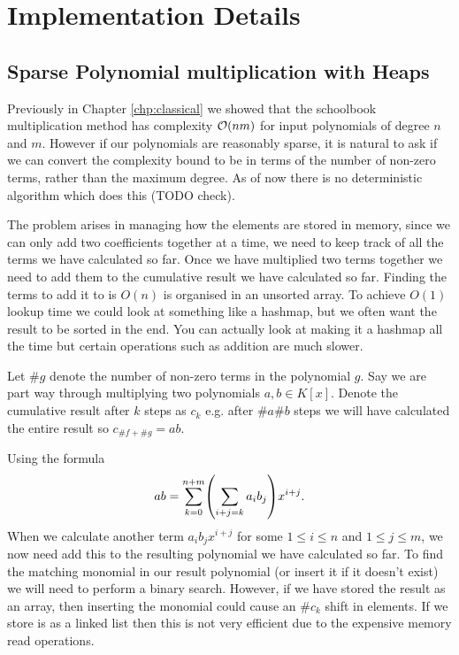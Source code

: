 \chapter{Implementation Details}\label{chp:implementation}

\section{Sparse Polynomial multiplication with Heaps}

Previously in Chapter \ref{chp:classical} we showed that the schoolbook multiplication method has complexity $\mathcal O(nm)$ for input polynomials of degree $n$ and $m$. However if our polynomials are reasonably sparse, it is natural to ask if we can convert the complexity bound to be in terms of the number of non-zero terms, rather than the maximum degree. As of now there is no deterministic algorithm which does this (TODO check). 

The problem arises in managing how the elements are stored in memory, since we can only add two coefficients together at a time, we need to keep track of all the terms we have calculated so far. Once we have multiplied two terms together we need to add them to the cumulative result we have calculated so far. Finding the terms to add it to is $O(n)$ is organised in an unsorted array. To achieve $O(1)$ lookup time we could look at something like a hashmap, but we often want the result to be sorted in the end. You can actually look at making it a hashmap all the time but certain operations such as addition are much slower.

Let $\# g$ denote the number of non-zero terms in the polynomial $g$. Say we are part way through multiplying two polynomials $a, b \in K[x]$. Denote the cumulative result after $k$ steps as $c_k$ e.g. after $\# a \# b$ steps we will have calculated the entire result so $c_{\#f + \#g} = ab$.

Using the formula
\[
    ab = \sum^{n + m}_{k=0} \bb{\sum_{i + j = k}a_ib_j} x^{i + j}.
\]
When we calculate another term $a_ib_j x^{i + j}$ for some $1 \le i \le n$ and $1 \le j \le m$, we now need add this to the resulting polynomial we have calculated so far. To find the matching monomial in our result polynomial (or insert it if it doesn't exist) we will need to perform a binary search. However, if we have stored the result as an array, then inserting the monomial could cause an $\#c_k$ shift in elements. If we store is as a linked list then this is not very efficient due to the expensive memory read operations.

